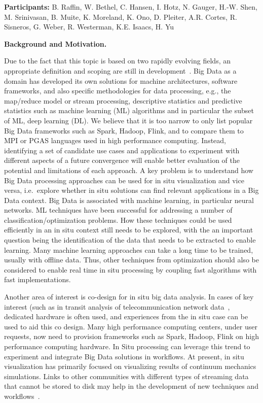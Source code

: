 \license

\textbf{\sffamily Participants:} B. Raffin, W. Bethel, C. Hansen, I. Hotz, N. Gauger, H.-W. Shen, M. Srinivasan, B. Muite, K. Moreland, K. Ono, D. Pleiter, A.R. Cortes, R. Sisneros, G. Weber, R. Westerman, K.E. Isaacs, H. Yu

\medskip\noindent
\textbf{\sffamily Background and Motivation.}

Due to the fact that this topic is based on two rapidly evolving fields, an appropriate definition and scoping are still in development~\cite{AA18}. 
Big Data as a domain has developed its own solutions for machine architectures, software frameworks, and also specific methodologies for data processing, e.g., the map/reduce model or stream processing, descriptive statistics and predictive statistics such as machine learning (ML) algorithms and in particular the subset of ML, deep learning (DL). 
We believe that it is too narrow to only list popular Big Data frameworks such as Spark, Hadoop, Flink, and to compare them to MPI or PGAS languages used in high performance computing.
Instead, identifying a set of candidate use cases and applications to experiment with different aspects of a future convergence will enable better evaluation of the potential and limitations of each approach. 
A key problem is to understand how Big Data processing approaches can be used for in situ visualization and vice versa, i.e.~explore whether in situ solutions can find relevant applications in a Big Data context.
Big Data is associated with machine learning, in particular neural networks. 
ML techniques have been successful for addressing a number of classification/optimization problems. 
How these techniques could be used efficiently in an in situ context still needs to be explored, with the an important question being the identification of the data that needs to be extracted to enable learning.  
Many machine learning approaches can take a long time to be trained, usually with offline data. 
Thus, other techniques from optimization should also be considered to enable real time in situ processing by coupling fast algorithms with fast implementations.

Another area of interest is co-design for in situ big data analysis. 
In cases of key interest (such as in transit analysis of telecommunication network data~\cite{GCC16}, dedicated hardware is often used, and experiences from the in situ case can be used to aid this co design.  
Many high performance computing centers, under user requests, now need to provision frameworks such as Spark, Hadoop, Flink on high performance computing hardware. 
In Situ processing can leverage this trend to experiment and integrate Big Data solutions in workflows. 
At present, in situ visualization has primarily focused on visualizing results of continuum mechanics simulations.
Links to other communities with different types of streaming data that cannot be stored to disk may help in the development of new techniques and workflows~\cite{A18,GCC16}.

